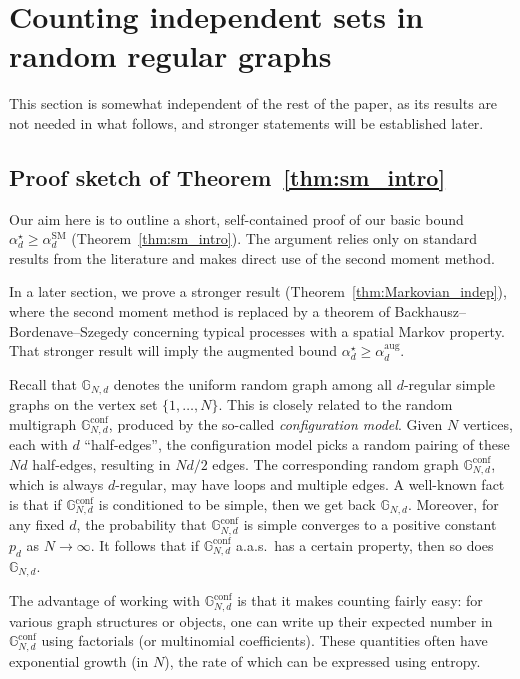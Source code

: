 \documentclass[12pt]{amsart}
\theoremstyle{definition}
\newcommand\Gb{\mathbb{G}}
\newcommand\Gbconf{\mathbb{G}^{\textrm{conf}}}
\newcommand\alstar{\alpha^{\star}}
\newcommand\alsm{\alpha^{\mathrm{SM}}}
\newcommand\alaug{\alpha^{\mathrm{aug}}}
\begin{document}
\section{Counting independent sets in random regular graphs}
\label{sec:counting}

This section is somewhat independent of the rest of the paper, as its results are not needed in what follows, and stronger statements will be established later.

\subsection{Proof sketch of Theorem~\ref{thm:sm_intro}}
%
Our aim here is to outline a short, self-contained proof of our basic bound $\alstar_d \geq \alsm_d$ (Theorem~\ref{thm:sm_intro}). The argument relies only on standard results from the literature and makes direct use of the second moment method.

In a later section, we prove a stronger result (Theorem~\ref{thm:Markovian_indep}), where the second moment method is replaced by a theorem of Backhausz--Bordenave--Szegedy concerning typical processes with a spatial Markov property. That stronger result will imply the augmented bound $\alstar_d \geq \alaug_d$.

Recall that $\Gb_{N,d}$ denotes the uniform random graph among all $d$-regular simple graphs on the vertex set $\{1,\ldots,N\}$. This is closely related to the random multigraph $\Gbconf_{N,d}$, produced by the so-called \emph{configuration model}. Given $N$ vertices, each with $d$ ``half-edges'', the configuration model picks a random pairing of these $Nd$ half-edges, resulting in $Nd/2$ edges. The corresponding random graph $\Gbconf_{N,d}$, which is always $d$-regular, may have loops and multiple edges. A well-known fact is that if $\Gbconf_{N,d}$ is conditioned to be simple, then we get back $\Gb_{N,d}$. Moreover, for any fixed $d$, the probability that $\Gbconf_{N,d}$ is simple converges to a positive constant $p_d$ as $N \to \infty$. It follows that if $\Gbconf_{N,d}$ a.a.s.~has a certain property, then so does $\Gb_{N,d}$.

The advantage of working with $\Gbconf_{N,d}$ is that it makes counting fairly easy: for various graph structures or objects, one can write up their expected number in $\Gbconf_{N,d}$ using factorials (or multinomial coefficients). These quantities often have exponential growth (in $N$), the rate of which can be expressed using entropy.
\end{document}
